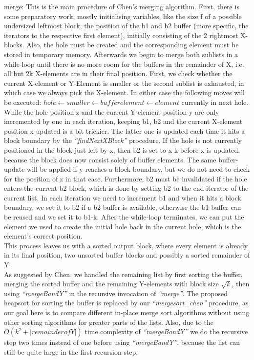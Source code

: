 \documentclass[11pt,pdftex,a4paper, twocolumn]{article}
\begin{document}
merge: This is the main procedure of Chen’s merging algorithm. First, there is some preparatory work, mostly initialising variables, like the size f of a possible undersized leftmost block, the position of the b1 and b2 buffer (more specific, the iterators to the respective first element), initially consisting of the 2 rightmost X-blocks. Also, the hole must be created and the corresponding element must be stored in temporary memory. Afterwards we begin to merge both sublists in a while-loop until there is no more room for the buffers in the remainder of X, i.e. all but 2k X-elements are in their final position. First, we check whether the current X-element or Y-Element is smaller or the second sublist is exhausted, in which case we always pick the X-element. In either case the following moves will be executed: $hole \leftarrow smaller \leftarrow buffer element \leftarrow element$ currently in next hole. While the hole position z and the current Y-element position y are only incremented by one in each iteration, keeping b1, b2 and the current X-element position x updated is a bit trickier. The latter one is updated each time it hits a block boundary by the \textit{“findNextXBlock”} procedure. If the hole is not currently positioned in the block just left by x, then b2 is set to x-k before x is updated, because the block does now consist solely of buffer elements. The same buffer-update will be applied if y reaches a block boundary, but we do not need to check for the position of z in that case. Furthermore, b2 must be invalidated if the hole enters the current b2 block, which is done by setting b2 to the end-iterator of the current list. In each iteration we need to increment b1 and when it hits a block boundary, we set it to b2 if a b2 buffer is available, otherwise the b1 buffer can be reused and we set it to b1-k. After the while-loop terminates, we can put the element we used to create the initial hole back in the current hole, which is the element’s correct position. \\
This process leaves us with a sorted output block, where every element is already in its final position, two unsorted buffer blocks and possibly a sorted remainder of Y. \\
As suggested by Chen, we handled the remaining list by first sorting the buffer, merging the sorted buffer and the remaining Y-elements with block size $\sqrt{k}$, then using \textit{“mergeBandY”} in the recursive invocation of \textit{“merge”}. The proposed heapsort for sorting the buffer is replaced by our \textit{“mergesort\_chen”} procedure, as our goal here is to compare different in-place merge sort algorithms without using other sorting algorithms for greater parts of the lists. Also, due to the $O(k^{2}+|remainder of Y|)$ time complexity of \textit{“mergeBandY”} we do the recursive step two times instead of one before using \textit{“mergeBandY”}, because the list can still be quite large in the first recursion step. \\
\end{document}
